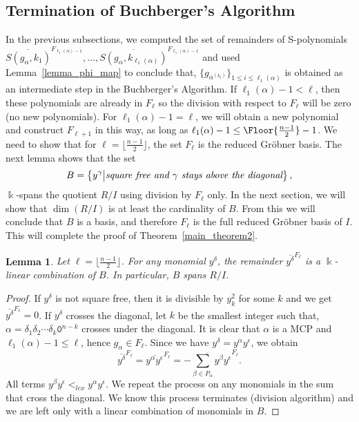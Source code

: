 \documentclass[10pt,a4paper]{article}
\newtheorem{lemma}{Lemma}[section]
\def\field{\Bbbk}
\DeclarePairedDelimiter\Floor\lfloor\rfloor
\begin{document}
\subsection{\label{property_c}Termination of Buchberger's Algorithm}
In the previous subsections, we computed the set of remainders  of S-polynomials $\overline{S(g_\alpha, k_1)}^{F_{\ell_1(\alpha)-1}}, \dots, \overline{S(g_\alpha, k_{\ell_1(\alpha)})}^{F_{\ell_1(\alpha)-1}}$ and used Lemma~\ref{lemma_phi_map} to conclude that, $\{g_{\alpha^{(k_i)}}\}_{1\le i\le \ell_1(\alpha)}$ is obtained as an intermediate step in the Buchberger's Algorithm. If $\ell_1(\alpha)-1<\ell$, then these polynomials are already in $F_\ell$ so the division with respect to $F_\ell$ will be zero (no new polynomials). For $\ell_1(\alpha)-1=\ell$, we will obtain a new polynomial and construct $F_{\ell+1}$ in this way, as long as $\ell_1(\alpha)-1 \le \Floor{\frac{n-1}{2}}-1$.
We need to show that for $\ell = \lfloor \frac{n-1}{2} \rfloor$, the set $F_\ell$ is the reduced Gr\"obner basis.
The next lemma shows that the set
\begin{equation} \label{Eq:basis1}
	B=\big\{ y^\gamma\big| \text{\it square free and $\gamma$ stays above the diagonal}\big\}\,,
\end{equation}
$\field$-spans the quotient $R/I$ using division by $F_\ell$ only. In the next section, we will show that $\dim(R/I)$ is at least the cardinality of $B$.
From this we will conclude that $B$ is a basis, and therefore $F_\ell$ is the full reduced Gr\"obner basis of $I$. This will complete the proof of Theorem~\ref{main_theorem2}.

\begin{lemma}
	    \label{lem:Bspan}
	    Let $\ell= \lfloor \frac{n-1}{2} \rfloor$. For any monomial $y^\delta$, the remainder $\overline{y^\delta}^{F_\ell}$ is a $\field$-linear combination of $B$. In particular, $B$ spans $R/I$.
    \end{lemma} 

\begin{proof}
If $y^\delta$ is not square free, then it is divisible by $y_k^2$ for some $k$ and we get $\overline{y^\delta}^{F_\ell}=0$. 
If $y^\delta$ crosses the diagonal, 
let $k$ be the smallest integer such that, $\alpha=\delta_1\delta_2\cdots\delta_k \texttt{0}^{n-k}$ 
crosses under the diagonal. It is clear that $\alpha$ is a MCP and $\ell_1(\alpha)-1\le \ell$, hence $g_\alpha\in F_\ell$. Since we have $y^\delta=y^\alpha y^\epsilon$, we obtain
\begin{equation}\label{eq:contra}
	\overline{y^\delta}^{F_\ell}=\overline{y^\alpha y^\epsilon}^{F_\ell}=\overline{-\sum_{\beta\in P_\alpha}y^\beta y^\epsilon}^{F_\ell}.
\end{equation}
All terms $y^\beta y^\epsilon<_{lex} y^\alpha y^\epsilon$. We repeat the process on any monomials in the sum that cross the diagonal. 
We know this process terminates (division algorithm) and we are left only with a linear combination of monomials in $B$.
\end{proof}
\end{document}
